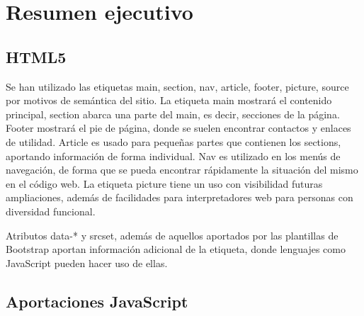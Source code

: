 \chapter{Resumen ejecutivo}

\section{HTML5}

Se han utilizado las etiquetas main, section, nav, article, footer, picture, 
source por motivos de sem\'{a}ntica del sitio. La etiqueta main mostrar\'{a} el contenido principal, section 
abarca una parte del main, es decir, secciones de la p\'{a}gina. Footer mostrar\'{a} el pie de p\'{a}gina, donde se suelen
encontrar contactos y enlaces de utilidad. Article es usado para peque\~{n}as partes que contienen los sections,
aportando informaci\'{o}n de forma individual. Nav es utilizado en los men\'{u}s de navegaci\'{o}n, de forma que se 
pueda encontrar r\'{a}pidamente la situaci\'{o}n del mismo en el c\'{o}digo web. La etiqueta picture tiene un uso con visibilidad
futuras ampliaciones, adem\'{a}s de facilidades para interpretadores web para personas con diversidad funcional.

Atributos data-* y srcset, adem\'{a}s de aquellos aportados por las plantillas de Bootstrap
 aportan informaci\'{o}n adicional de la etiqueta, donde lenguajes como JavaScript pueden hacer uso de ellas.


\section{Aportaciones JavaScript }

